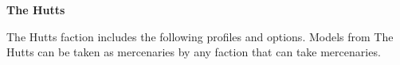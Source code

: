 \documentclass{article}
\begin{document}
\vspace{0.6cm}

{\Large \textbf{The Hutts}}
\vspace{0.3cm}

\begin{minipage}{19cm}
    The Hutts faction includes the following profiles and options.
    Models from The Hutts can be taken as mercenaries
    by any faction that can take mercenaries.
\end{minipage}

\vspace{0.3cm}
{\scriptsize
\setlength\extrarowheight{1.5pt}

}
\end{document}
